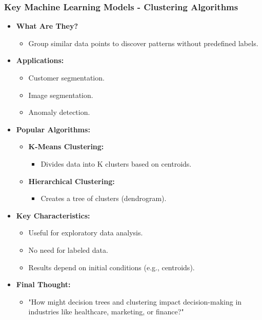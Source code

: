 \documentclass[aspectratio=169]{beamer}
\begin{document}
\begin{frame}[fragile]
    \frametitle{Key Machine Learning Models - Clustering Algorithms}
    \begin{itemize}
        \item \textbf{What Are They?}
            \begin{itemize}
                \item Group similar data points to discover patterns without predefined labels.
            \end{itemize}
        \item \textbf{Applications:}
            \begin{itemize}
                \item Customer segmentation.
                \item Image segmentation.
                \item Anomaly detection.
            \end{itemize}
        \item \textbf{Popular Algorithms:}
            \begin{itemize}
                \item \textbf{K-Means Clustering:} 
                    \begin{itemize}
                        \item Divides data into K clusters based on centroids.
                    \end{itemize}
                \item \textbf{Hierarchical Clustering:} 
                    \begin{itemize}
                        \item Creates a tree of clusters (dendrogram).
                    \end{itemize}
            \end{itemize}
        \item \textbf{Key Characteristics:}
            \begin{itemize}
                \item Useful for exploratory data analysis.
                \item No need for labeled data.
                \item Results depend on initial conditions (e.g., centroids).
            \end{itemize}
        \item \textbf{Final Thought:}
            \begin{itemize}
                \item "How might decision trees and clustering impact decision-making in industries like healthcare, marketing, or finance?"
            \end{itemize}
    \end{itemize}
\end{frame}
\end{document}
